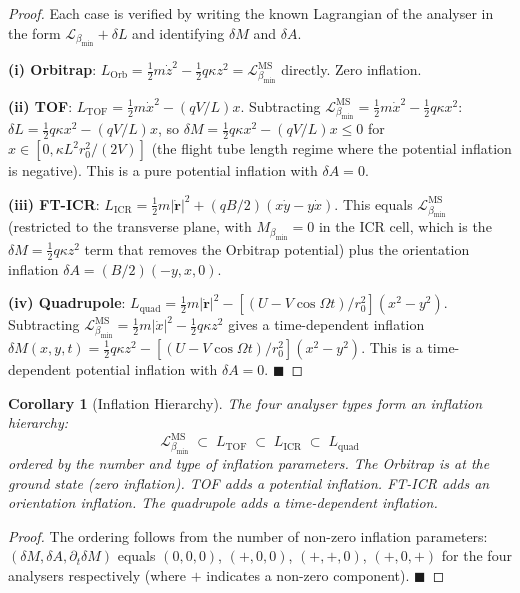 \documentclass[12pt, a4paper]{article}
\theoremstyle{plain}
\newtheorem{corollary}[theorem]{Corollary}
\theoremstyle{definition}
\theoremstyle{remark}
\newcommand{\bmin}{\beta_{\min}}
\newcommand{\Lmin}{\mathcal{L}_{\bmin}}
\newcommand{\half}{\tfrac{1}{2}}
\newcommand{\qed}{\hfill$\blacksquare$}
\begin{document}
\begin{proof}
Each case is verified by writing the known Lagrangian of the analyser in the
form $\Lmin + \delta L$ and identifying $\delta M$ and $\delta A$.

\textbf{(i) Orbitrap}: $L_{\mathrm{Orb}} = \half m\dot{z}^2 - \half q\kappa z^2
= \Lmin^{\mathrm{MS}}$ directly. Zero inflation.

\textbf{(ii) TOF}: $L_{\mathrm{TOF}} = \half m\dot{x}^2 - (qV/L)x$.
Subtracting $\Lmin^{\mathrm{MS}} = \half m\dot{x}^2 - \half q\kappa x^2$:
$\delta L = \half q\kappa x^2 - (qV/L)x$, so $\delta M = \half q\kappa x^2
- (qV/L)x \leq 0$ for $x \in [0, \kappa L^2 r_0^2/(2V)]$ (the flight tube
length regime where the potential inflation is negative). This is a pure
potential inflation with $\delta A = 0$.

\textbf{(iii) FT-ICR}: $L_{\mathrm{ICR}} = \half m|\dot{\mathbf{r}}|^2 +
(qB/2)(x\dot{y} - y\dot{x})$. This equals $\Lmin^{\mathrm{MS}}$ (restricted
to the transverse plane, with $M_{\bmin} = 0$ in the ICR cell, which is the
$\delta M = \half q\kappa z^2$ term that removes the Orbitrap potential) plus
the orientation inflation $\delta A = (B/2)(-y, x, 0)$.

\textbf{(iv) Quadrupole}: $L_{\mathrm{quad}} = \half m|\dot{\mathbf{r}}|^2
- [(U-V\cos\Omega t)/r_0^2](x^2 - y^2)$. Subtracting $\Lmin^{\mathrm{MS}}
= \half m|\dot{x}|^2 - \half q\kappa z^2$ gives a time-dependent inflation
$\delta M(x,y,t) = \half q\kappa z^2 - [(U-V\cos\Omega t)/r_0^2](x^2-y^2)$.
This is a time-dependent potential inflation with $\delta A = 0$. \qed
\end{proof}

\begin{corollary}[Inflation Hierarchy]
\label{cor:hierarchy}
The four analyser types form an inflation hierarchy:
\[
  \Lmin^{\mathrm{MS}} \;\subset\; L_{\mathrm{TOF}} \;\subset\; L_{\mathrm{ICR}}
  \;\subset\; L_{\mathrm{quad}}
\]
ordered by the number and type of inflation parameters. The Orbitrap is at the
ground state (zero inflation). TOF adds a potential inflation. FT-ICR adds an
orientation inflation. The quadrupole adds a time-dependent inflation.
\end{corollary}

\begin{proof}
The ordering follows from the number of non-zero inflation parameters:
$(\delta M, \delta A, \partial_t \delta M)$ equals $(0,0,0)$, $(+,0,0)$,
$(+,+,0)$, $(+,0,+)$ for the four analysers respectively (where $+$ indicates
a non-zero component). \qed
\end{proof}
\end{document}

